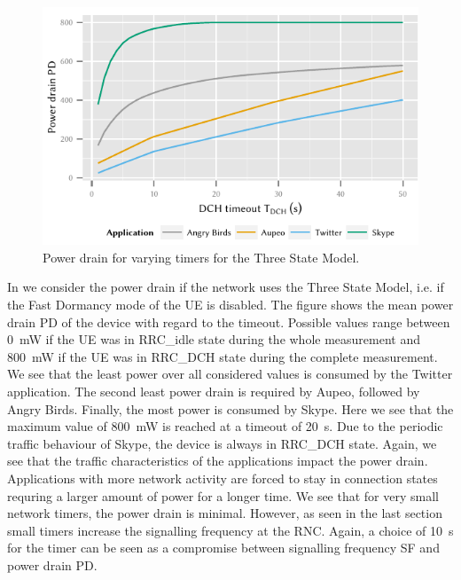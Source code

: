 \begin{figure}
	\centering
	\includegraphics{network/network_traces/numerical_results/figures/3_state_tdch_vs_power_drain}
	\caption{Power drain  for varying \TDCH timers for the Three State Model.}\label{fig:network:network_traces:numerical_results:three_states:power_drain}
\end{figure}
In  we consider the power drain if the network uses the Three State Model, i.e. if the Fast Dormancy mode of the \gls{UE} is disabled.
The figure shows the mean power drain \gls{PD} of the device with regard to the \TDCH timeout.
Possible values range between \SI{0}{\milli\watt} if the \gls{UE} was in \gls{RRC_idle} state during the whole measurement and \SI{800}{\milli\watt} if the \gls{UE} was in \gls{RRC_DCH} state during the complete measurement.
We see that the least power over all considered \TDCH values is consumed by the Twitter application.
The second least power drain is required by Aupeo, followed by Angry Birds.
Finally, the most power is consumed by Skype.
Here we see that the maximum value of \SI{800}{\milli\watt} is reached at a \TDCH timeout of \SI{20}{\second}.
Due to the periodic traffic behaviour of Skype, the device is always in \gls{RRC_DCH} state.
Again, we see that the traffic characteristics of the applications impact the power drain.
Applications with more network activity are forced to stay in connection states requring a larger amount of power for a longer time.
We see that for very small network timers, the power drain is minimal.
However, as seen in the last section small timers increase the signalling frequency at the \gls{RNC}.
Again, a choice of \SI{10}{\second} for the \TDCH timer can be seen as a compromise between signalling frequency \gls{SF} and power drain \gls{PD}.

